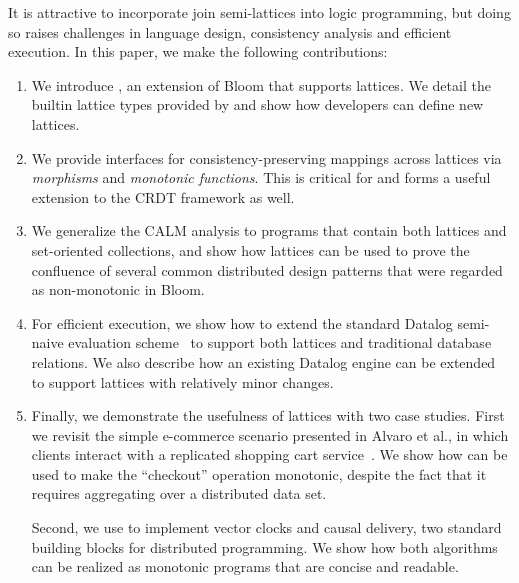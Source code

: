 It is attractive to incorporate join semi-lattices into logic programming,  but doing so raises challenges in language design, consistency analysis and efficient execution.  In this paper, we make the following contributions:
\begin{enumerate}

\item
  We introduce \lang, an extension of Bloom that supports lattices. We detail
  the builtin lattice types provided by \lang and show how developers can
  define new lattices.
  
\item 
  We provide interfaces for consistency-preserving mappings across lattices via
  \emph{morphisms} and \emph{monotonic functions}.  This is critical for \lang
  and forms a useful extension to the CRDT framework as well.

\item 
  We generalize the CALM analysis to programs that contain both lattices and
  set-oriented collections, and show how lattices can be used to prove the
  confluence of several common distributed design patterns that were regarded as
  non-monotonic in Bloom. %

\item
  For efficient execution, we show how to extend the standard Datalog semi-naive
  evaluation scheme~\cite{Balbin1987} to support both lattices and traditional
  database relations. We also describe how an existing Datalog engine can be
  extended to support lattices with relatively minor changes.

\item
  Finally, we demonstrate the usefulness of lattices with two case studies.
  First we revisit the simple e-commerce scenario presented in Alvaro et al., in
  which clients interact with a replicated shopping cart
  service~\cite{Alvaro2011}. We show how \lang can be used to make the
  ``checkout'' operation monotonic, despite the fact that it requires
  aggregating over a distributed data set.

  Second, we use \lang to implement vector clocks and causal delivery, two
  standard building blocks for distributed programming. We show how both
  algorithms can be realized as monotonic \lang programs that are concise and
  readable.
\end{enumerate}
